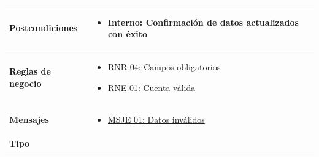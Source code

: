 \begin{center}
\begin{longtable}{| p{3.5cm} | p{11.5cm} |}
        \hline  
          \textbf{Postcondiciones} & 
                \begin{itemize}
                  \item \textbf{Interno:} Confirmación de datos actualizados con éxito
                \end{itemize} \\
        \hline
          \textbf{Reglas de negocio} & 
              \begin{itemize}
                  \item {\hyperref[rnr_04]{RNR 04: Campos obligatorios}}
                 \item {\hyperref[rnr_01]{RNE 01: Cuenta válida}}
              \end{itemize} \\
        \hline
          \textbf{Mensajes} & 
              \begin{itemize}
                 \item {\hyperref[msje_01]{MSJE 01: Datos inválidos}}
              \end{itemize} \\
        \hline
          \textbf{Tipo} & \\
        \hline      
  \end{longtable}
\end{center}
\endgroup

